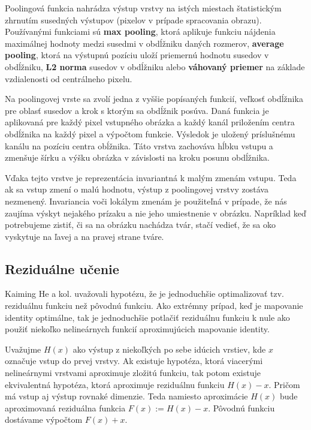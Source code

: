 Poolingová funkcia nahrádza výstup vrstvy na istých miestach štatistickým zhrnutím susedných výstupov (pixelov v prípade spracovania obrazu). Používanými funkciami sú {\bf max pooling}, ktorá aplikuje funkciu nájdenia maximálnej hodnoty medzi susedmi v obdĺžniku daných rozmerov, {\bf average pooling}, ktorá na výstupnú pozíciu uloží priemernú hodnotu susedov v obdĺžniku, {\bf L2 norma} susedov v obdĺžniku alebo {\bf váhovaný priemer} na základe vzdialenosti od centrálneho pixelu.

Na poolingovej vrste sa zvolí jedna z vyššie popísaných funkcií, veľkosť obdĺžnika pre oblasť susedov a krok s ktorým sa obdĺžnik posúva. Daná funkcia je aplikovaná pre každý pixel vstupného obrázka a každý kanál priložením centra obdĺžnika na každý pixel a výpočtom funkcie. Výsledok je uložený príslušnému kanálu na pozíciu centra obĺžnika. Táto vrstva zachováva hĺbku vstupu a zmenšuje šírku a výšku obrázka v závislosti na kroku posunu obdĺžnika.

Vďaka tejto vrstve je reprezentácia invariantná k malým zmenám vstupu. Teda ak sa vstup zmení o malú hodnotu, výstup z poolingovej vrstvy zostáva nezmenený. Invariancia voči lokálym zmenám je použiteľná v prípade, že nás zaujíma výskyt nejakého prízaku a nie jeho umiestnenie v obrázku. Napríklad keď potrebujeme zistiť, či sa na obrázku nachádza tvár, stačí vedieť, že sa oko vyskytuje na ľavej a na pravej strane tváre. \cite{Goodfellow-et-al-2016}

\subsection{Reziduálne učenie}\label{sec:residual}
Kaiming He a kol. \cite{DBLP:journals/corr/HeZRS15} uvažovali hypotézu, že je jednoduchšie optimalizovať tzv. reziduálnu funkciu než pôvodnú funkciu. Ako extrémny prípad, keď je mapovanie identity optimálne, tak je jednoduchšie potlačiť reziduálnu funkciu k nule ako použiť niekoľko nelineárnych funkcií aproximujúcich mapovanie identity.

Uvažujme $H(x)$ ako výstup z niekoľkých po sebe idúcich vrstiev, kde $x$ označuje vstup do prvej vrstvy. Ak existuje hypotéza, ktorá viacerými nelineárnymi vrstvami aproximuje zložitú funkciu, tak potom existuje ekvivalentná hypotéza, ktorá aproximuje reziduálnu funkciu $H(x) - x$. Pričom má vstup aj výstup rovnaké dimenzie. Teda namiesto aproximácie $H(x)$ bude aproximovaná reziduálna funkcia $F(x) := H(x) - x$. Pôvodnú funkciu dostávame výpočtom $F(x) + x$.


